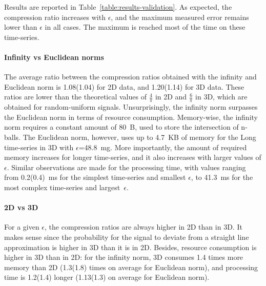 \documentclass[10pt, conference, compsocconf]{IEEEtran}
\begin{document}
Results are reported in Table~\ref{table:results-validation}. 
As expected, the compression ratio increases with $\epsilon$, and the 
maximum measured error remains lower than $\epsilon$ in all cases. The 
maximum is reached most of the time on these time-series.

\paragraph{Infinity vs Euclidean norms}
The average ratio between the compression ratios obtained
with the infinity and Euclidean norm is 1.08(1.04) for 2D data, and 1.20(1.14)
for 3D data. These ratios are lower than the theoretical values of
$\frac{4}{\pi}$ in 2D and $\frac{6}{\pi}$ in 3D, which are obtained for
random-uniform signals. Unsurprisingly, the infinity norm surpasses the
Euclidean norm in terms of resource consumption. Memory-wise, the
infinity norm requires a constant amount of 80~B, used to store the
intersection of n-balls. The Euclidean norm, however, uses up to 4.7~KB of memory
for the Long time-series in 3D with $\epsilon$=48.8~mg. More importantly,
the amount of required memory increases for longer time-series, and it also increases with larger
values of $\epsilon$. Similar observations are made for the processing
time, with values ranging from 0.2(0.4)~ms for the simplest time-series and
smallest $\epsilon$, to 41.3~ms for the most complex time-series and
largest~$\epsilon$.

\paragraph{2D vs 3D}
For a given $\epsilon$, the compression
ratios are always higher in 2D than in 3D. It makes sense since the
probability for the signal to deviate from a straight line
approximation is higher in 3D than it is in 2D. Besides, resource
consumption is higher in 3D than in 2D: for the infinity norm, 3D
consumes 1.4 times more memory than 2D (1.3(1.8) times on average for
Euclidean norm), and processing time is 1.2(1.4) longer (1.13(1.3) on
average for Euclidean norm).
\end{document}
